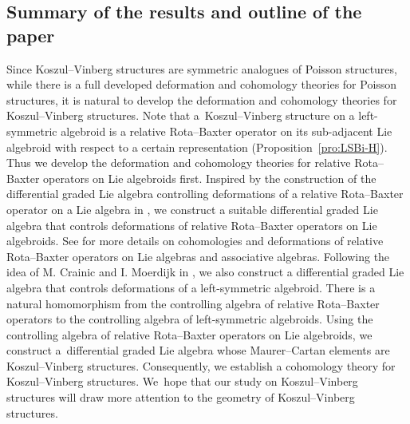 \documentclass[pdftex]{sigma}%
\numberwithin{equation}{section}
\begin{document}
\subsection{Summary of the results and outline of the paper}
Since Koszul--Vinberg structures are symmetric analogues of Poisson structures, while there is a full developed deformation and cohomology theories for Poisson structures, it is natural to develop the deformation and cohomology theories for Koszul--Vinberg structures.
 Note that a~Koszul--Vinberg structure on a left-symmetric algebroid is a relative Rota--Baxter operator on its sub-adjacent Lie algebroid with respect to a certain representation (Proposition~\ref{pro:LSBi-H}). Thus we develop the deformation and cohomology theories for relative Rota--Baxter operators on Lie algebroids first.
Inspired by the construction of the differential graded Lie algebra controlling deformations of a relative Rota--Baxter operator on a Lie algebra in \cite{TBGS}, we construct a suitable differential graded Lie algebra that controls deformations of relative Rota--Baxter operators on Lie algebroids. See \cite{Das,TBGS} for more details on cohomologies and deformations of relative Rota--Baxter operators on Lie algebras and associative algebras. Following the idea of M. Crainic and I. Moerdijk in \cite{deformation-cohomology-LA}, we also construct a differential graded Lie algebra that controls deformations of a left-symmetric algebroid. There is a natural homomorphism from the controlling algebra of relative Rota--Baxter operators to the controlling algebra of left-symmetric algebroids.
\mbox{Using} the controlling algebra of relative Rota--Baxter operators on Lie algebroids, we construct a~differential graded Lie algebra whose Maurer--Cartan elements are Koszul--Vinberg structures. Consequently, we establish a cohomology theory for Koszul--Vinberg structures. We~hope that our study on Koszul--Vinberg structures will draw more attention to the geometry of Koszul--Vinberg structures.
\end{document}
